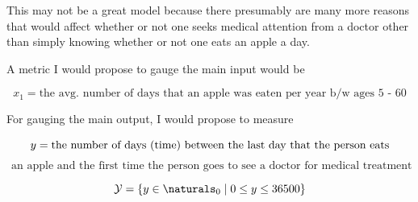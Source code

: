 \documentclass[12pt]{article}
\begin{document}
\begin{enumerate}
\begin{tcolorbox}[colback=white, sharp corners]

This may not be a great model because there presumably are many more reasons that would affect whether or not one seeks medical attention from a doctor other than simply knowing whether or not one eats an apple a day. 

\end{tcolorbox}


\begin{tcolorbox}[colback=white, sharp corners]

A metric I would propose to gauge the main input would be 

\vspace{-5mm}

\[
x_1 = \text{the avg. number of days that an apple was eaten per year b/w ages 5 - 60}
\]

\end{tcolorbox}


\begin{tcolorbox}[colback=white, sharp corners]

For gauging the main output, I would propose to measure 

\vspace{-5mm}

\[
y = \text{the number of days (time) between the last day that the person eats}\\
\]
\[
\text{ an apple and the first time the person goes to see a doctor for medical treatment}
\]

\end{tcolorbox}


\begin{tcolorbox}[colback=white, sharp corners]

\[
	\mathcal{Y} = \lbrace y \in \naturals_0 \mid  0 \leq y \leq 36500 \rbrace
\]


\end{tcolorbox}
\end{enumerate}
\end{document}
